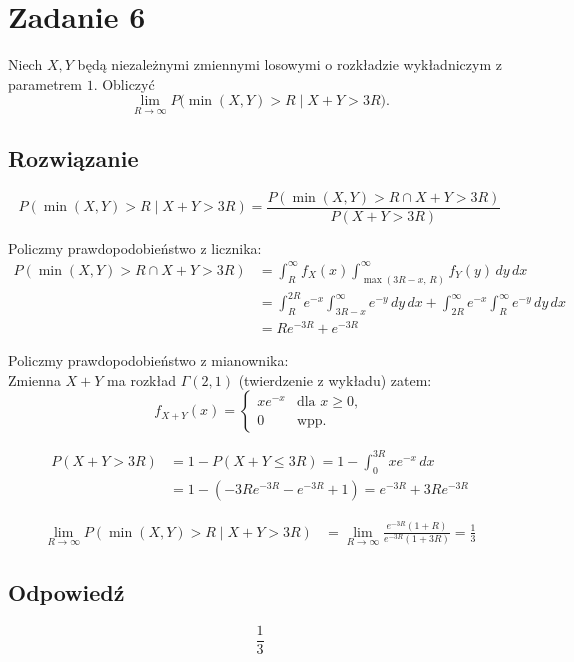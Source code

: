 \section{Zadanie 6}
Niech \(X,Y\) będą niezależnymi zmiennymi losowymi o rozkładzie wykładniczym
z parametrem \(1\). Obliczyć
\[
	\lim_{R\to\infty} P\bigl(\min(X,Y)>R \mid X+Y>3R\bigr).
\]


\subsection*{Rozwiązanie}
\[
	P(\min(X,Y) > R \mid X+Y > 3R)
	=
	\frac{P(\min(X,Y)>R \cap X+Y > 3R)}{P(X+Y>3R)}
\]

Policzmy prawdopodobieństwo z licznika:\\

\[
	\begin{aligned}
		P(\min(X,Y)>R \cap X+Y>3R)
		 & = \int_{R}^\infty f_X(x)
		\int_{\max(3R-x,\,R)}^\infty f_Y(y)\,dy\,dx \\
		 & = \int_R^{2R} e^{-x}
		\int_{3R-x}^\infty e^{-y}\,dy\,dx
		+ \int_{2R}^\infty e^{-x}
		\int_R^\infty e^{-y}\,dy\,dx                \\
		 & = R e^{-3R} + e^{-3R}
	\end{aligned}
\]

Policzmy prawdopodobieństwo z mianownika:\\

Zmienna \(X+Y\) ma rozkład \(\Gamma(2,1)\) (twierdzenie z wykładu) zatem:\\

\[
	f_{X+Y}(x) =
	\begin{cases}
		x e^{-x} & \text{dla } x \geq 0, \\
		0        & \text{wpp.}
	\end{cases}
\]

\[
	\begin{aligned}
		P(X+Y > 3R)
		 & = 1 - P(X+Y \leq 3R)
		= 1 - \int_0^{3R} x e^{-x}\,dx       \\
		 & = 1 - (-3R e^{-3R} - e^{-3R} + 1)
		= e^{-3R} + 3R e^{-3R}
	\end{aligned}
\]

\[
	\begin{aligned}
		\lim_{R\to \infty} P(\min(X,Y) > R \mid X+Y > 3R)
		 & = \lim_{R\to \infty}
		\frac{e^{-3R}(1 + R)}{e^{-3R}(1 + 3R)}
		= \frac{1}{3}
	\end{aligned}
\]


\subsection*{Odpowiedź}
\[
	\boxed{\frac{1}{3}}
\]
